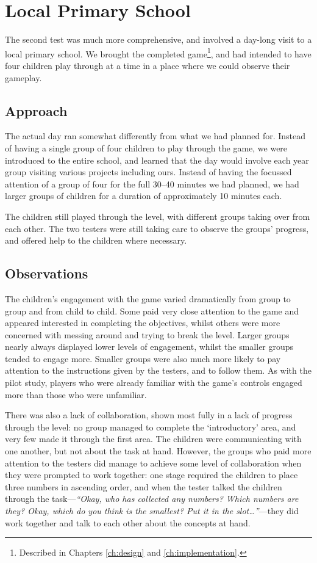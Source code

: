 \section{Local Primary School}
The second test was much more comprehensive, and involved a day-long visit to
a local primary school. We brought the completed game\footnote{Described in Chapters
\ref{ch:design} and \ref{ch:implementation}.}, and had intended to have four
children play through at a time in a place where we could observe their gameplay.

\subsection{Approach}
The actual day ran somewhat differently from what we had planned for. Instead of
having a single group of four children to play through the game, we were introduced
to the entire school, and learned that the day would involve each year group visiting
various projects including ours. Instead of having the focussed attention of a group
of four for the full 30--40 minutes we had planned, we had larger groups of children
for a duration of approximately 10 minutes each.

The children still played through the level, with different groups taking over from
each other. The two testers were still taking care to observe the groups' progress,
and offered help to the children where necessary.

\subsection{Observations}
The children's engagement with the game varied dramatically from group to group
and from child to child. Some paid very close attention to the game and appeared
interested in completing the objectives, whilst others were more concerned with
messing around and trying to break the level. Larger groups nearly always displayed
lower levels of engagement, whilst the smaller groups tended to engage more. Smaller
groups were also much more likely to pay attention to the instructions given
by the testers, and to follow them. As with the pilot study, players who were
already familiar with the game's controls engaged more than those who were unfamiliar.

There was also a lack of collaboration, shown most fully in a lack of progress through the level:
no group managed to complete the `introductory' area, and very few made it through
the first area. The children were communicating with one another, but not about the
task at hand. However, the groups who paid more attention
to the testers did manage to achieve some level of collaboration when they were
prompted to work together: one stage required the children to place three numbers
in ascending order, and when the tester talked the children through the task---\textit{``Okay,
who has collected any numbers? Which numbers are they? Okay, which do you
think is the smallest? Put it in the slot\ldots''}---they did work together and talk
to each other about the concepts at hand.

